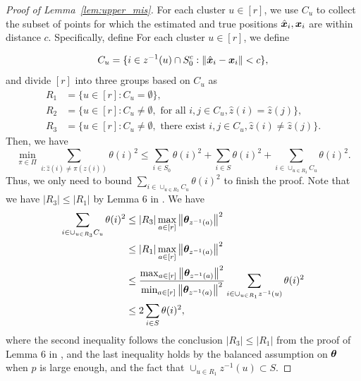\documentclass[lettersize,journal]{IEEEtran}
\theoremstyle{definition}
\theoremstyle{definition}
\begin{document}
\begin{proof}[Proof of Lemma~\ref{lem:upper_mis}] 

For each cluster $u\in[r]$, we use $C_u$ to collect the subset of points for which the estimated and true positions $\hat {\bm x}_i, \bm x_i$ are within distance $c$. Specifically, define
For each cluster $u \in [r]$, we define 

\begin{equation}
    C_u = \{ i \in z^{-1}(u) \cap S_0^c: \left\lVert\hat {\bm x}_i - \bm x_i\right\rVert < c \},
\end{equation}
and divide $[r]$ into three groups based on $C_u$ as 
\begin{align}
    R_1 &= \{ u \in [r]: C_u = \emptyset \},\\
    R_2 &= \{ u \in [r]: C_u \neq \emptyset, \text{ for all } i, j \in C_u, \hat z(i) = \hat z(j) \},\\
    R_3 &= \{ u \in [r]: C_u \neq \emptyset, \text{ there exist } i, j \in C_u, \hat z(i) \neq \hat z(j) \}.
\end{align}
Then, we have 
\begin{equation}
    \min_{\pi \in \Pi} \sum_{i : \hat z(i) \neq \pi(z(i))} \theta(i)^2 \leq \sum_{i \in S_0} \theta(i)^2 + \sum_{i \in S} \theta(i)^2 + \sum_{ i \in \cup_{u \in R_3} C_u} \theta(i)^2.
\end{equation}
Thus, we only need to bound $\sum_{ i \in \cup_{u \in R_3} C_u} \theta(i)^2$ to finish the proof. Note that we have $|R_3| \leq |R_1|$ by Lemma 6 in \citep{gao2018community}. We have 
\begin{align}
    \sum_{ i \in \cup_{u \in R_3} C_u} \theta(i)^2 &\leq |R_3| \max_{a \in [r]} \left\lVert\boldsymbol{\theta}_{z^{-1}(a)}\right\rVert^2 \\
    & \leq |R_1| \max_{a \in [r]} \left\lVert\boldsymbol{\theta}_{z^{-1}(a)}\right\rVert^2  \\
    & \leq {\max_{a \in [r]} \left\lVert\boldsymbol{\theta}_{z^{-1}(a)}\right\rVert^2 \over \min_{a \in [r]} \left\lVert\boldsymbol{\theta}_{z^{-1}(a)}\right\rVert^2 } \sum_{i \in \cup_{u \in R_1} z^{-1}(u)} \theta(i)^2\\
    & \leq 2 \sum_{i \in S} \theta(i)^2,
\end{align}
where the second inequality follows the conclusion $|R_3| \leq |R_1|$ from the proof of Lemma 6 in \citep{gao2018community}, and the last inequality holds by the balanced assumption on $\boldsymbol{\theta}$ when $p$ is large enough, and the fact that $ \cup_{u \in R_1} z^{-1}(u) \subset S$.

\end{proof}
\end{document}
